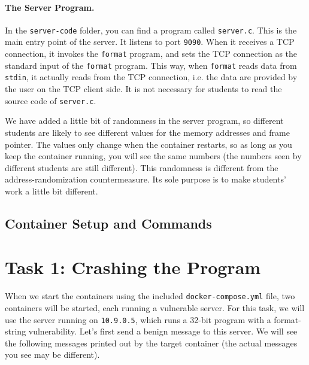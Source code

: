 \paragraph{The Server Program.}
In the \texttt{server-code} folder, you can find a program called \texttt{server.c}.
This is the main entry point of the server. It listens to port \texttt{9090}.
When it receives a TCP connection, it
invokes the \texttt{format} program, and sets the TCP connection
as the standard input of the \texttt{format} program. This way,
when \texttt{format} reads data from \texttt{stdin}, it actually
reads from the TCP connection, i.e. the data are provided by
the user on the TCP client side. It is not necessary for
students to read the source code of \texttt{server.c}.

We have added a little bit of randomness
in the server program, so different students are likely to see different values
for the memory addresses and frame pointer. The values only change
when the container restarts, so as long as you keep the
container running, you will see the same numbers (the numbers
seen by different students are still different). This randomness
is different from the address-randomization countermeasure. Its sole
purpose is to make students' work a little bit different.


\subsection{Container Setup and Commands}







\section{Task 1: Crashing the Program}

When we start the containers using the included
\texttt{docker-compose.yml} file, two containers will be
started, each running a vulnerable server. 
For this task, we will use the server running on \texttt{10.9.0.5}, 
which runs a 32-bit program with a format-string vulnerability. 
Let's first send a benign message to this server.
We will see the following messages printed out by the target container (the
actual messages you see may be different).

